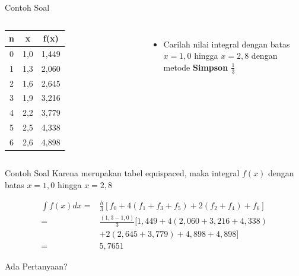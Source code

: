 \documentclass[10pt]{beamer}
\begin{document}
\begin{frame}[fragile]{Contoh Soal}
    \begin{columns}[T,onlytextwidth]
        \begin{table}
            \begin{tabular}{@{} ccc @{}}
            \toprule
            \textbf{n} &   \textbf{x} & \textbf{f(x)}\\
            \midrule
            0 &   1,0 & 1,449\\
            1 &   1,3 & 2,060\\
            2 &   1,6 & 2,645\\
            3 &   1,9 & 3,216\\
            4 &   2,2 & 3,779\\
            5 &   2,5 & 4,338\\
            6 &   2,6 & 4,898\\
            \bottomrule
            \end{tabular}
        \end{table}

        \begin{itemize}
            \item Carilah nilai integral dengan batas $x = 1,0$ hingga $x = 2,8$ dengan metode \textbf{Simpson $\frac{1}{3}$}
        \end{itemize}
    \end{columns}
\end{frame}

\begin{frame}[fragile]{Contoh Soal}
    Karena merupakan tabel \alert{equispaced}, maka integral $f(x)$ dengan batas $x = 1,0$ hingga $x = 2,8$
    
    \begin{align*}
        \int f(x) dx =& \frac{h}{3}[f_0 + 4(f_1 + f_3 + f_5) + 2(f_2 + f_4) + f_6]\\
        {} =& \frac{(1,3 - 1,0)}{3}[1,449 + 4(2,060 + 3,216 + 4,338) \\
        &+ 2(2,645 + 3,779) + 4,898 + 4,898] \\
        {} =& 5,7651
    \end{align*}
\end{frame}

\begin{frame}[standout]
    Ada Pertanyaan?
\end{frame}
  
\appendix
  
\end{document}
